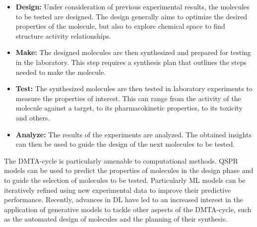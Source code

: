 \begin{itemize}
      \item \textbf{Design:} Under consideration of previous experimental results, the molecules to
            be tested are designed. The design generally aims to optimize the desired properties of
            the molecule, but also to explore chemical space to find structure activity relationships.
      \item \textbf{Make:} The designed molecules are then synthesized and prepared for testing in
            the laboratory. This step requires a synthesis plan that outlines the steps needed to
            make the molecule.
      \item \textbf{Test:} The synthesized molecules are then tested in laboratory experiments to
            measure the properties of interest. This can range from the activity of the molecule
            against a target, to its pharmacokinetic properties, to its toxicity and others.
      \item \textbf{Analyze:} The results of the experiments are analyzed. The obtained insights
            can then be used to guide the design of the next molecules to be tested.
\end{itemize}

The \ac{DMTA}-cycle is particularly amenable to computational methods. \ac{QSPR} models can be used
to predict the properties of molecules in the design phase and to guide the selection of molecules
to be tested. Particularly \ac{ML} models can be iteratively refined using new experimental data to
improve their predictive performance. Recently, advances in \ac{DL} have led to an increased
interest in the application of generative models to tackle other aspects of the \ac{DMTA}-cycle,
such as the automated design of molecules and the planning of their synthesis.

